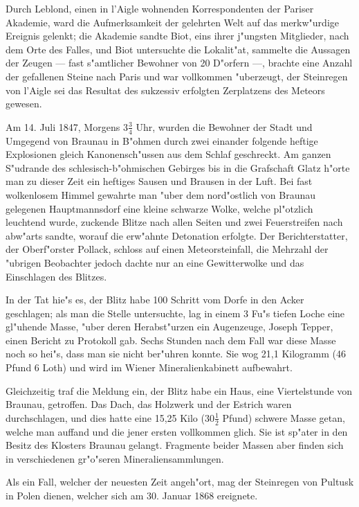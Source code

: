 \documentclass[a4paper, 11pt, oneside, german]{article}
\begin{document}
Durch Leblond, einen in l'Aigle wohnenden Korrespondenten der Pariser Akademie, ward die Aufmerksamkeit der gelehrten Welt auf das merkw"urdige Ereignis gelenkt; die Akademie sandte Biot, eins ihrer j"ungsten Mitglieder, nach dem Orte des Falles, und Biot untersuchte die Lokalit"at, sammelte die Aussagen der Zeugen --- fast s"amtlicher Bewohner von 20 D"orfern ---, brachte eine Anzahl der gefallenen Steine nach Paris und war vollkommen "uberzeugt, der Steinregen von l'Aigle sei das Resultat des sukzessiv erfolgten Zerplatzens des Meteors gewesen.

Am 14. Juli 1847, Morgens $3\frac{3}{4}$ Uhr, wurden die Bewohner der Stadt und Umgegend von Braunau in B"ohmen durch zwei einander folgende heftige Explosionen gleich Kanonensch"ussen aus dem Schlaf geschreckt. Am ganzen S"udrande des schlesisch-b"ohmischen Gebirges bis in die Grafschaft Glatz h"orte man zu dieser Zeit ein heftiges Sausen und Brausen in der Luft. Bei fast wolkenlosem Himmel gewahrte man "uber dem nord"ostlich von Braunau gelegenen Hauptmannsdorf eine kleine schwarze Wolke, welche pl"otzlich leuchtend wurde, zuckende Blitze nach allen Seiten und zwei Feuerstreifen nach abw"arts sandte, worauf die erw"ahnte Detonation erfolgte. Der Berichterstatter, der Oberf"orster Pollack, schloss auf einen Meteorsteinfall, die Mehrzahl der "ubrigen Beobachter jedoch dachte nur an eine Gewitterwolke und das Einschlagen des Blitzes.

In der Tat hie"s es, der Blitz habe 100 Schritt vom Dorfe in den Acker geschlagen; als man die Stelle untersuchte, lag in einem 3 Fu"s tiefen Loche eine gl"uhende Masse, "uber deren Herabst"urzen ein Augenzeuge, Joseph Tepper, einen Bericht zu Protokoll gab. Sechs Stunden nach dem Fall war diese Masse noch so hei"s, dass man sie nicht ber"uhren konnte. Sie wog 21,1 Kilogramm (46 Pfund 6 Loth) und wird im Wiener Mineralienkabinett aufbewahrt.

Gleichzeitig traf die Meldung ein, der Blitz habe ein Haus, eine Viertelstunde von Braunau, getroffen. Das Dach, das Holzwerk und der Estrich waren durchschlagen, und dies hatte eine 15,25 Kilo ($30\frac{1}{2}$ Pfund) schwere Masse getan, welche man auffand und die jener ersten vollkommen glich. Sie ist sp"ater in den Besitz des Klosters Braunau gelangt. Fragmente beider Massen aber finden sich in verschiedenen gr"o"seren Mineraliensammlungen.

Als ein Fall, welcher der neuesten Zeit angeh"ort, mag der Steinregen von Pultusk in Polen dienen, welcher sich am 30. Januar 1868 ereignete.
\end{document}
